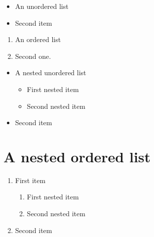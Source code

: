 
  \begin{itemize}
    \item An unordered list
    \item Second item
  \end{itemize}

  \begin{enumerate}
    \item An ordered list
    \item Second one.
  \end{enumerate}

  \begin{itemize}
    \item A nested unordered list
    \begin{itemize}
      \item First nested item
      \item Second nested item
    \end{itemize}
    \item Second item
  \end{itemize}

  \section{A nested ordered list}
  \begin{enumerate}
    \item First item
    \begin{enumerate}
      \item First nested item
      \item Second nested item
    \end{enumerate}
    \item Second item
  \end{enumerate}


